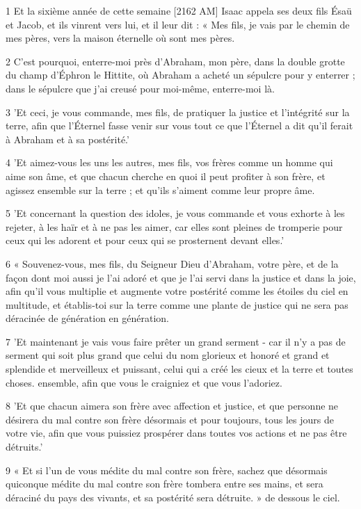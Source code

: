 \par 1 Et la sixième année de cette semaine [2162 AM] Isaac appela ses deux fils Ésaü et Jacob, et ils vinrent vers lui, et il leur dit : « Mes fils, je vais par le chemin de mes pères, vers la maison éternelle où sont mes pères.
\par 2 C'est pourquoi, enterre-moi près d'Abraham, mon père, dans la double grotte du champ d'Éphron le Hittite, où Abraham a acheté un sépulcre pour y enterrer ; dans le sépulcre que j'ai creusé pour moi-même, enterre-moi là.
\par 3 'Et ceci, je vous commande, mes fils, de pratiquer la justice et l'intégrité sur la terre, afin que l'Éternel fasse venir sur vous tout ce que l'Éternel a dit qu'il ferait à Abraham et à sa postérité.'
\par 4 'Et aimez-vous les uns les autres, mes fils, vos frères comme un homme qui aime son âme, et que chacun cherche en quoi il peut profiter à son frère, et agissez ensemble sur la terre ; et qu'ils s'aiment comme leur propre âme.
\par 5 'Et concernant la question des idoles, je vous commande et vous exhorte à les rejeter, à les haïr et à ne pas les aimer, car elles sont pleines de tromperie pour ceux qui les adorent et pour ceux qui se prosternent devant elles.'
\par 6 « Souvenez-vous, mes fils, du Seigneur Dieu d'Abraham, votre père, et de la façon dont moi aussi je l'ai adoré et que je l'ai servi dans la justice et dans la joie, afin qu'il vous multiplie et augmente votre postérité comme les étoiles du ciel en multitude, et établis-toi sur la terre comme une plante de justice qui ne sera pas déracinée de génération en génération.
\par 7 'Et maintenant je vais vous faire prêter un grand serment - car il n'y a pas de serment qui soit plus grand que celui du nom glorieux et honoré et grand et splendide et merveilleux et puissant, celui qui a créé les cieux et la terre et toutes choses. ensemble, afin que vous le craigniez et que vous l'adoriez.
\par 8 'Et que chacun aimera son frère avec affection et justice, et que personne ne désirera du mal contre son frère désormais et pour toujours, tous les jours de votre vie, afin que vous puissiez prospérer dans toutes vos actions et ne pas être détruits.'
\par 9 « Et si l'un de vous médite du mal contre son frère, sachez que désormais quiconque médite du mal contre son frère tombera entre ses mains, et sera déraciné du pays des vivants, et sa postérité sera détruite. » de dessous le ciel.
